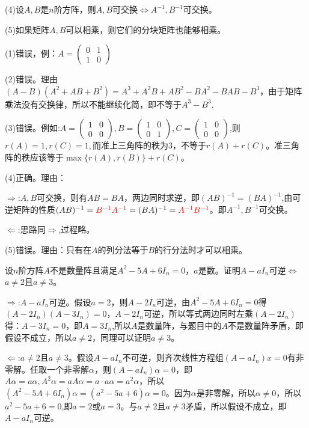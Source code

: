 \documentclass[a4paper]{report}
\begin{document}
(4)设$A,B$是$n$阶方阵，则$A,B$可交换$\Leftrightarrow A^{-1},B^{-1}$可交换。

(5)如果矩阵$A,B$可以相乘，则它们的分块矩阵也能够相乘。

\begin{jie}
(1)错误，例：$A=
\begin{pmatrix}
0&1 \\ 1&0
\end{pmatrix}
$

(2)错误。理由$(A-B)(A^2+AB+B^2)=A^3+A^2B+AB^2-BA^{2}-BAB-B^3$，由于矩阵乘法没有交换律，所以不能继续化简，即不等于$A^3-B^3$.

(3)错误。例如:$A=
\begin{pmatrix}
1&0\\0&0
\end{pmatrix},B=
\begin{pmatrix}
1&0\\0&1
\end{pmatrix},C=
\begin{pmatrix}
1&0\\0&0
\end{pmatrix}
$,则$r(A)=1,r(C)=1,$而准上三角阵的秩为3，不等于$r(A)+r(C)$。准三角阵的秩应该等于$\max\{r(A),r(B)\}+r(C)$。

(4)正确。理由：

$\Rightarrow$:$A,B$可交换，则有$AB=BA$，两边同时求逆，即$(AB)^{-1}=(BA)^{-1}$,由可逆矩阵的性质$(AB)^{-1}=\textcolor[rgb]{1.00,0.00,0.00}{B^{-1}A^{-1}}=(BA)^{-1}=\textcolor[rgb]{1.00,0.00,0.00}{A^{-1}B^{-1}}$。即$A^{-1},B^{-1}$可交换。

$\Leftarrow$:思路同$\Rightarrow$,过程略。

(5)错误。理由：只有在$A$的列分法等于$B$的行分法时才可以相乘。
\end{jie}

\EX 设$n$阶方阵$A$不是数量阵且满足$A^2-5A+6I_n=0$，$a$是数。证明$A-aI_n$可逆$\Leftrightarrow$ $a\neq 2$且$a\neq3$。

\begin{zhengming}
$\Rightarrow$:$A-aI_n$可逆。假设$a=2$，则$A-2I_n$可逆，由$A^2-5A+6I_n=0$得$(A-2I_n)(A-3I_{n})=0$，$A-2I_n$可逆，所以等式两边同时左乘$(A-2I_n)$得：$A-3I_{n}=0$，即$A=3I_{n}$,所以$A$是数量阵，与题目中的$A$不是数量阵矛盾，即假设不成立，所以$a\neq 2$，同理可以证明$a\neq 3$。

$\Leftarrow$:$a\neq 2$且$a\neq3$。假设$A-aI_n$不可逆，则齐次线性方程组$(A-aI_n)x=0$有非零解。任取一个非零解$\alpha$，则$(A-aI_n)\alpha=0$，即$A\alpha=a\alpha,A^2\alpha=aA\alpha=a\cdot a\alpha=a^2\alpha$，所以$(A^2-5A+6I_{n})\alpha=(a^2-5a+6)\alpha=0$。因为$\alpha$是非零解，所以$\alpha\neq 0$，所以$a^2-5a+6=0$,即$a=2$或$a=3$。与$a\neq 2$且$a\neq 3$矛盾，所以假设不成立，即$A-aI_n$可逆。
\end{zhengming}
\end{document}
